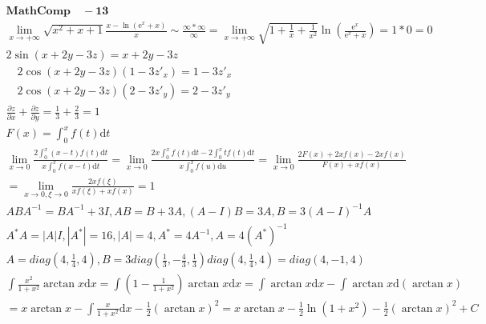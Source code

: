 \documentclass{article}
\begin{document}
\clearpage 
\begin{align*}
    \mathbf{Math Comp \quad - 13}\\
    \lim_{x \to +\infty} \sqrt{x^2+x+1}\frac{x-\ln(\mathrm{e}^{x}+x)}{x} \sim \frac{\infty * \infty}{\infty}
    = \lim_{x \to +\infty} \sqrt{1+\frac{1}{x}+\frac{1}{x^2}}\ln \left(\frac{\mathrm{e}^{x}}{\mathrm{e}^{x}+x}\right) = 1 * 0 = 0 \\
    2\sin(x+2y-3z) = x+2y-3z \\ 
    \quad 2\cos(x+2y-3z) (1-3z'_{x}) = 1-3z'_{x} \\
    \quad 2\cos(x+2y-3z)(2-3z'_{y}) =2-3z'_{y} \\
    \frac{\partial z}{\partial x} + \frac{\partial z}{\partial y} = \frac{1}{3} + \frac{2}{3} = 1\\ 
    F(x) = \int_{0}^{x} f(t) \mathrm{d}t \\
    \lim_{x \to 0}\frac{2\int_{0}^{x}(x-t)f(t)\mathrm{d}t}{x\int_{0}^{x}f(x-t)\mathrm{d}t} = \lim_{x \to 0} \frac{2x\int_{0}^{x}f(t)\mathrm{d}t-2\int_{0}^{x}tf(t)\mathrm{d}t}{x\int_{0}^{x}f(u)\mathrm{d}u} = \lim_{x \to 0} \frac{2F(x)+2xf(x)-2xf(x)}{F(x)+xf(x)} \\ 
    = \lim_{x \to 0 , \xi \to 0} \frac{2xf(\xi)}{xf(\xi)+xf(x)} = 1 \\
    ABA^{-1} = BA^{-1}+3I , AB = B + 3A , (A-I)B = 3A , B = 3(A-I)^{-1}A \\
    A^{*}A = |A|I , |A^{*}| = 16 , |A| = 4 , A^{*} = 4A^{-1}, A = 4\left(A^{*}\right)^{-1} \\
    A = diag(4,\frac{1}{4},4) , B = 3diag(\frac{1}{3},-\frac{4}{3},\frac{1}{3})diag(4,\frac{1}{4},4) = diag(4,-1,4)\\
    \int \frac{x^2}{1+x^2} \arctan x \mathrm{d}x = \int \left(1-\frac{1}{1+x^2}\right) \arctan x \mathrm{d}x = \int \arctan x\mathrm{d}x - \int \arctan x \mathrm{d}(\arctan x) \\
    = x\arctan x - \int \frac{x}{1+x^2} \mathrm{d}x - \frac{1}{2} (\arctan x)^2 = x\arctan x - \frac{1}{2} \ln(1+x^2) - \frac{1}{2}(\arctan x)^2 + C \\
\end{align*}
\end{document}
